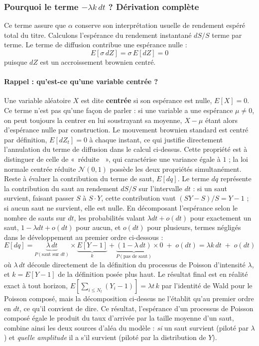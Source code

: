 \documentclass{article}
\providecommand{\og}{«~}
\providecommand{\fg}{~»}
\begin{document}
\subsubsection*{Pourquoi le terme $-\lambda k\, dt$ ? Dérivation complète}
Ce terme assure que $\alpha$ conserve son interprétation usuelle de rendement espéré total du titre. Calculons l'espérance du rendement instantané $dS/S$ terme par terme.
Le terme de diffusion contribue une espérance nulle :
\begin{equation}
E[\sigma\, dZ] = \sigma\, E[dZ] = 0
\end{equation}
puisque $dZ$ est un accroissement brownien centré.
\paragraph{Rappel : qu'est-ce qu'une variable centrée ?} Une variable aléatoire $X$ est dite \textbf{centrée} si son espérance est nulle, $E[X]=0$. Ce terme n'est pas qu'une façon de parler : si une variable a une espérance $\mu \neq 0$, on peut toujours la centrer en lui soustrayant sa moyenne, $X-\mu$ étant alors d'espérance nulle par construction. Le mouvement brownien standard est centré par définition, $E[dZ_t]=0$ à chaque instant, ce qui justifie directement l'annulation du terme de diffusion dans le calcul ci-dessus. Cette propriété est à distinguer de celle de \og réduite \fg{}, qui caractérise une variance égale à $1$ ; la loi normale centrée réduite $\mathcal{N}(0,1)$ possède les deux propriétés simultanément.
Reste à évaluer la contribution du terme de saut, $E[dq]$. Le terme $dq$ représente la contribution du saut au rendement $dS/S$ sur l'intervalle $dt$ : si un saut survient, faisant passer $S$ à $S\cdot Y$, cette contribution vaut $(SY-S)/S = Y-1$ ; si aucun saut ne survient, elle est nulle. En décomposant l'espérance selon le nombre de sauts sur $dt$, les probabilités valant $\lambda dt + o(dt)$ pour exactement un saut, $1-\lambda dt+o(dt)$ pour aucun, et $o(dt)$ pour plusieurs, termes négligés dans le développement au premier ordre ci-dessous :
\begin{equation}
E[dq] = \underbrace{\lambda\, dt}_{P(\text{saut sur } dt)} \times \underbrace{E[Y-1]}_{k} + \underbrace{(1-\lambda\, dt)}_{P(\text{pas de saut})} \times 0 \;+\; o(dt) = \lambda k\, dt \;+\; o(dt)
\end{equation}
où $\lambda\, dt$ découle directement de la définition du processus de Poisson d'intensité $\lambda$, et $k=E[Y-1]$ de la définition posée plus haut. Le résultat final est en réalité exact à tout horizon, $E[\sum_{i\leq N_t}(Y_i-1)]=\lambda t\,k$ par l'identité de Wald pour le Poisson composé, mais la décomposition ci-dessus ne l'établit qu'au premier ordre en $dt$, ce qu'il convient de dire. Ce résultat, l'espérance d'un processus de Poisson composé égale le produit du taux d'arrivée par la taille moyenne d'un saut, combine ainsi les deux sources d'aléa du modèle : \emph{si} un saut survient (piloté par $\lambda$) et \emph{quelle amplitude} il a s'il survient (piloté par la distribution de $Y$).
\end{document}
